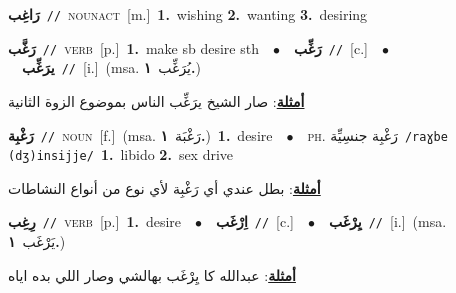 \documentclass[10pt,a4paper,twoside]{article} %
\begin{document}
\begin{multicols}{2}
{\setlength\topsep{0pt}\textbf{\foreignlanguage{arabic}{رَاغِب}}\ {\color{gray}\texttt{//}\color{black}}\ \textsc{noun\textunderscore act}\ [m.]\ \textbf{1.}~wishing  \textbf{2.}~wanting  \textbf{3.}~desiring\ } \vspace{2mm}

{\setlength\topsep{0pt}\textbf{\foreignlanguage{arabic}{رَغَّب}}\ {\color{gray}\texttt{//}\color{black}}\ \textsc{verb}\ [p.]\ \textbf{1.}~make sb desire sth\ \ $\bullet$\ \ \setlength\topsep{0pt}\textbf{\foreignlanguage{arabic}{رَغِّب}}\ {\color{gray}\texttt{//}\color{black}}\ [c.]\ \ $\bullet$\ \ \setlength\topsep{0pt}\textbf{\foreignlanguage{arabic}{يرَغِّب}}\ {\color{gray}\texttt{//}\color{black}}\ [i.]\ \color{gray}(msa. \foreignlanguage{arabic}{يُرَغِّب}~\foreignlanguage{arabic}{\textbf{١.}})\color{black}\  \begin{flushright}\color{gray}\foreignlanguage{arabic}{\textbf{\underline{\foreignlanguage{arabic}{أمثلة}}}: صار الشيخ يرَغِّب الناس بموضوع الزوة الثانية}\end{flushright}\color{black}} \vspace{2mm}

{\setlength\topsep{0pt}\textbf{\foreignlanguage{arabic}{رَغْبِة}}\ {\color{gray}\texttt{//}\color{black}}\ \textsc{noun}\ [f.]\ \color{gray}(msa. \foreignlanguage{arabic}{رَغْبَة}~\foreignlanguage{arabic}{\textbf{١.}})\color{black}\ \textbf{1.}~desire\ \ $\bullet$\ \ \textsc{ph.} \color{gray} \foreignlanguage{arabic}{رَغْبِة جنسِيِّة}\color{black}\ {\color{gray}\texttt{/{\sffamily raɣbe (dʒ)insijje}/}\color{black}}\ \textbf{1.}~libido  \textbf{2.}~sex drive\  \begin{flushright}\color{gray}\foreignlanguage{arabic}{\textbf{\underline{\foreignlanguage{arabic}{أمثلة}}}: بطل عندي أي رَغْبِة لأي نوع من أنواع النشاطات}\end{flushright}\color{black}} \vspace{2mm}

{\setlength\topsep{0pt}\textbf{\foreignlanguage{arabic}{رِغِب}}\ {\color{gray}\texttt{//}\color{black}}\ \textsc{verb}\ [p.]\ \textbf{1.}~desire\ \ $\bullet$\ \ \setlength\topsep{0pt}\textbf{\foreignlanguage{arabic}{اِرْغَب}}\ {\color{gray}\texttt{//}\color{black}}\ [c.]\ \ $\bullet$\ \ \setlength\topsep{0pt}\textbf{\foreignlanguage{arabic}{يِرْغَب}}\ {\color{gray}\texttt{//}\color{black}}\ [i.]\ \color{gray}(msa. \foreignlanguage{arabic}{يَرْغَب}~\foreignlanguage{arabic}{\textbf{١.}})\color{black}\  \begin{flushright}\color{gray}\foreignlanguage{arabic}{\textbf{\underline{\foreignlanguage{arabic}{أمثلة}}}: عبدالله كا يِرْغَب بهالشي وصار اللي بده اياه}\end{flushright}\color{black}} \vspace{2mm}


\end{multicols}
\end{document}
